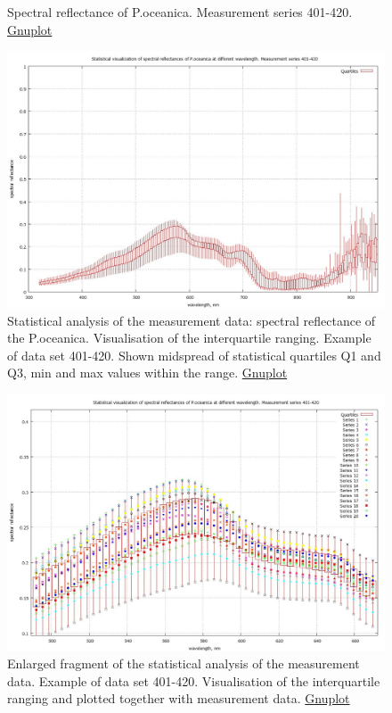 \documentclass[10pt, a4paper]{article}
\begin{document}
\begin{appendices}
\begin{figure}[h]
\begin{center}
		\caption{Spectral reflectance of P.oceanica. Measurement series 401-420. \href{http://www.gnuplot.info/}{Gnuplot}}
		\label{fig:A.12}
	\end{center}
\end{figure}
\begin{figure}[h]
	\begin{center}
		\includegraphics[scale=0.20]{GNU-401-420-candles.jpg}
		\caption{Statistical analysis of the measurement data: spectral reflectance of the P.oceanica. 
		Visualisation of the interquartile ranging. Example of data set 401-420. Shown midspread of  statistical quartiles Q1 and Q3, min and max values within the range. \href{http://www.gnuplot.info/}{Gnuplot}}
		\label{fig:A.13}
	\end{center}
\end{figure}
\begin{figure}[H]
	\begin{center}
		\includegraphics[scale=0.20]{GNU-enlarged-M-401-420.jpg}
		\caption{Enlarged fragment of the statistical analysis of the measurement data. Example of data set 401-420. 
		Visualisation of the interquartile ranging and plotted together with measurement data. \href{http://www.gnuplot.info/}{Gnuplot}}
		\label{fig:A.14}
	\end{center}
\end{figure}
\pagebreak


\end{appendices}
\end{document}
